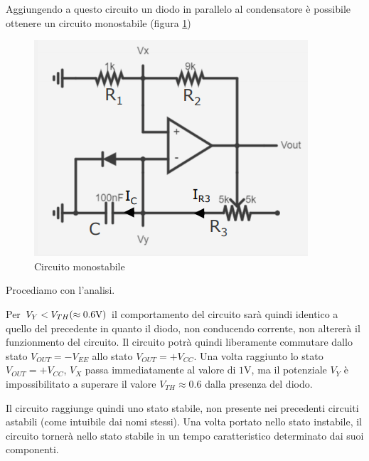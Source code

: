 \documentclass{article}
\begin{document}
\vspace{3mm}

Aggiungendo a questo circuito un diodo in parallelo al condensatore è possibile ottenere un circuito monostabile (figura \ref{Schema_circuito_monostabile})

\clearpage

\begin{figure}[h]
  \centering
  \includegraphics[scale=0.7]{IM_circuito_monostabile}
  \caption{Circuito monostabile}
  \label{Schema_circuito_monostabile}
\end{figure}

Procediamo con l'analisi.

\vspace{1mm}

Per $V_Y < V_{TH} (\approx 0.6 \textrm V)$ il comportamento del circuito sarà quindi identico a quello del precedente in quanto il diodo, non conducendo corrente, non altererà il funzionmento del circuito. Il circuito potrà quindi liberamente commutare dallo stato $V_{OUT} = - V_{EE}$ allo stato $V_{OUT} = + V_{CC}$. Una volta raggiunto lo stato $V_{OUT} = + V_{CC}$, $V_X$ passa immediatamente al valore di $1$V, ma il potenziale $V_Y$ è impossibilitato a superare il valore $V_{TH} \approx 0.6$ dalla presenza del diodo. 

\vspace{3mm}

Il circuito raggiunge quindi uno stato stabile, non presente nei precedenti circuiti astabili (come intuibile dai nomi stessi). Una volta portato nello stato instabile, il circuito tornerà nello stato stabile in un tempo caratteristico determinato dai suoi componenti. 

\vspace{3mm}
\end{document}
